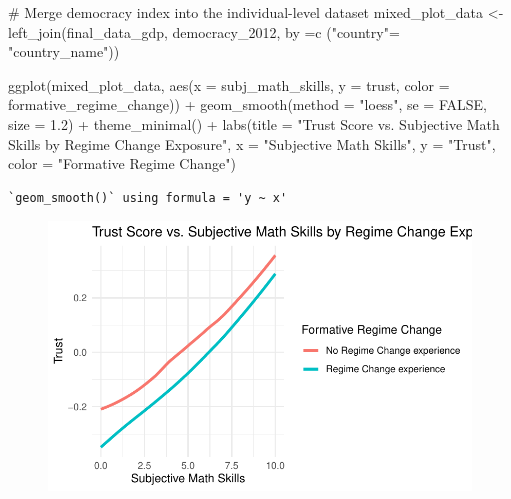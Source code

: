 \documentclass[
  letterpaper,
  DIV=11,
  numbers=noendperiod]{scrartcl}
\newenvironment{Shaded}{\begin{snugshade}}{\end{snugshade}}
\newcommand{\AttributeTok}[1]{\textcolor[rgb]{0.40,0.45,0.13}{#1}}
\newcommand{\CommentTok}[1]{\textcolor[rgb]{0.37,0.37,0.37}{#1}}
\newcommand{\ConstantTok}[1]{\textcolor[rgb]{0.56,0.35,0.01}{#1}}
\newcommand{\FloatTok}[1]{\textcolor[rgb]{0.68,0.00,0.00}{#1}}
\newcommand{\FunctionTok}[1]{\textcolor[rgb]{0.28,0.35,0.67}{#1}}
\newcommand{\NormalTok}[1]{\textcolor[rgb]{0.00,0.23,0.31}{#1}}
\newcommand{\OtherTok}[1]{\textcolor[rgb]{0.00,0.23,0.31}{#1}}
\newcommand{\SpecialCharTok}[1]{\textcolor[rgb]{0.37,0.37,0.37}{#1}}
\newcommand{\StringTok}[1]{\textcolor[rgb]{0.13,0.47,0.30}{#1}}
\begin{document}
\begin{Shaded}
\begin{Highlighting}[]
\CommentTok{\# Merge democracy index into the individual{-}level dataset}
\NormalTok{mixed\_plot\_data }\OtherTok{\textless{}{-}} \FunctionTok{left\_join}\NormalTok{(final\_data\_gdp, democracy\_2012, }\AttributeTok{by =}\FunctionTok{c}\NormalTok{ (}\StringTok{"country"}\OtherTok{=} \StringTok{"country\_name"}\NormalTok{))}



\FunctionTok{ggplot}\NormalTok{(mixed\_plot\_data, }\FunctionTok{aes}\NormalTok{(}\AttributeTok{x =}\NormalTok{ subj\_math\_skills, }\AttributeTok{y =}\NormalTok{ trust, }\AttributeTok{color =}\NormalTok{ formative\_regime\_change)) }\SpecialCharTok{+} 
  \FunctionTok{geom\_smooth}\NormalTok{(}\AttributeTok{method =} \StringTok{"loess"}\NormalTok{, }\AttributeTok{se =} \ConstantTok{FALSE}\NormalTok{, }\AttributeTok{size =} \FloatTok{1.2}\NormalTok{) }\SpecialCharTok{+}
  \FunctionTok{theme\_minimal}\NormalTok{() }\SpecialCharTok{+}
  \FunctionTok{labs}\NormalTok{(}\AttributeTok{title =} \StringTok{"Trust Score vs. Subjective Math Skills by Regime Change Exposure"}\NormalTok{,}
       \AttributeTok{x =} \StringTok{"Subjective Math Skills"}\NormalTok{,}
       \AttributeTok{y =} \StringTok{"Trust"}\NormalTok{,}
       \AttributeTok{color =} \StringTok{"Formative Regime Change"}\NormalTok{)}
\end{Highlighting}
\end{Shaded}

\begin{verbatim}
`geom_smooth()` using formula = 'y ~ x'
\end{verbatim}

\begin{figure}[H]

{\centering \includegraphics{Milestone-2-Data_files/figure-pdf/unnamed-chunk-11-1.pdf}

}

\end{figure}
\end{document}
